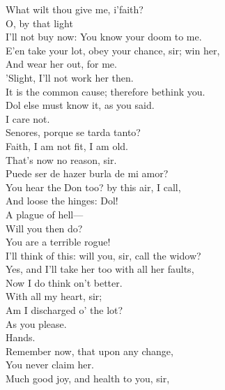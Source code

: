 \documentclass[a4paper,oneside]{memoir}
\begin{document}
\begin{drama*}
What wilt thou give me, i'faith?\\
\facespeaks {} O, by that light\\
I'll not buy now: You know your doom to me.\\
E'en take your lot, obey your chance, sir; win her,\\
And wear her out, for me.\\
\subtlespeaks {} 'Slight, I'll not work her then.\\
\facespeaks It is the common cause; therefore bethink you.\\
Dol else must know it, as you said.\\
\subtlespeaks {} I care not.\\
\surlyspeaks Senores, porque se tarda tanto?\\
\subtlespeaks Faith, I am not fit, I am old.\\
\facespeaks {} That's now no reason, sir.\\
\surlyspeaks Puede ser de hazer burla de mi amor?\\
\facespeaks You hear the Don too? by this air, I call,\\
And loose the hinges: Dol!\\
\subtlespeaks {} A plague of hell---\\
\facespeaks Will you then do?\\
\subtlespeaks {} You are a terrible rogue!\\
I'll think of this: will you, sir, call the widow?\\
\facespeaks Yes, and I'll take her too with all her faults,\\
Now I do think on't better.\\
\subtlespeaks {} With all my heart, sir;\\
Am I discharged o' the lot?\\
\facespeaks {} As you please.\\
\subtlespeaks {} Hands.\\
\facespeaks Remember now, that upon any change,\\
You never claim her.\\
\subtlespeaks {} Much good joy, and health to you, sir,\\

\end{drama*}
\end{document}
